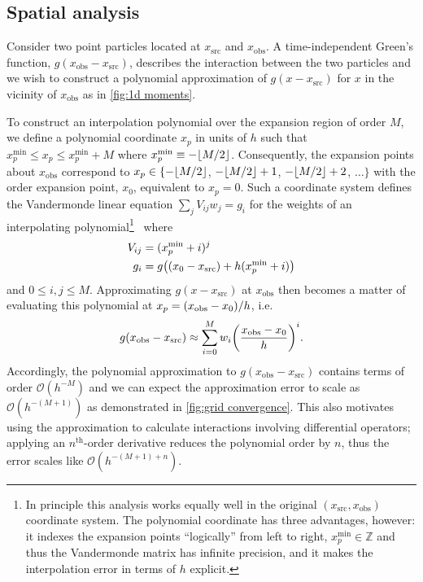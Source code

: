 \subsection{Spatial analysis}

Consider two point particles located at $x_\text{src}$ and $x_\text{obs}$.
A time-independent Green's function, $g(x_\text{obs} - x_\text{src})$, describes the interaction between the two particles and we wish to construct a polynomial approximation of $g(x - x_\text{src})$ for $x$ in the vicinity of $x_\text{obs}$ as in \cref{fig:1d moments}.

To construct an interpolation polynomial over the expansion region of order $M$, we define a polynomial coordinate $x_p$ in units of $h$ such that $x_p^\text{min} \leqslant x_p \leqslant x_p^\text{min} + M$ where $x_p^\text{min} \equiv -\floor*{M/2}$.
Consequently, the expansion points about $x_\text{obs}$ correspond to $x_p \in \{-\floor*{M/2}$, $-\floor*{M/2} + 1$, $-\floor*{M/2} + 2$, $\ldots\}$ with the  order expansion point, $x_0$, equivalent to $x_p = 0$.
Such a coordinate system defines the Vandermonde linear equation $\sum_{j}V_{ij} w_j = g_i$ for the weights of an interpolating polynomial\footnote{In principle this analysis works equally well in the original $(x_\text{src}, x_\text{obs})$ coordinate system. The polynomial coordinate has three advantages, however: it indexes the expansion points ``logically'' from left to right, $x_p^\text{min} \in \mathbb{Z}$ and thus the Vandermonde matrix has infinite precision, and it makes the interpolation error in terms of $h$ explicit.}~\cite{NumericalRecipes} where
\begin{subequations}
  \begin{align}
    V_{ij} &= (x_p^\text{min} + i)^j \\
    g_i &= g\qty((x_0 - x_\text{src}) + h(x_p^\text{min} + i))
  \end{align}
\end{subequations}
and $0 \leqslant i, j \leqslant M$.
Approximating $g(x - x_\text{src})$ at $x_\text{obs}$ then becomes a matter of evaluating this polynomial at $x_p = \qty(x_\text{obs} - x_0)/h$, i.e.
\begin{equation}
  g(x_\text{obs} - x_\text{src}) \approx \sum_{i = 0}^{M} w_i \qty(\frac{x_\text{obs} - x_0}{h})^i.
\end{equation}
Accordingly, the polynomial approximation to $g(x_\text{obs} - x_\text{src})$ contains terms of order $\mathcal{O}(h^{-M})$ and we can expect the approximation error to scale as $\mathcal{O}(h^{-(M + 1)})$ as demonstrated in \cref{fig:grid convergence}.
This also motivates using the approximation to calculate interactions involving differential operators; applying an $n^\text{th}$-order derivative reduces the polynomial order by $n$, thus the error scales like $\mathcal{O}(h^{-(M + 1) + n})$.

